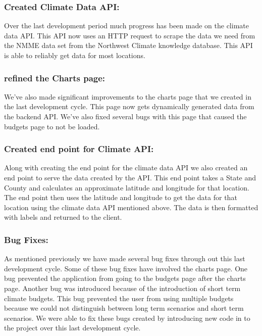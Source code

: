 \documentclass[onecolumn, draftclsnofoot,10pt, compsoc]{article}
\begin{document}
		\subsubsection{Created Climate Data API:}
		Over the last development period much progress has been made on the climate data API. This API now uses an HTTP request to scrape the data we need from the NMME data set from the Northwest Climate knowledge database. This API is able to reliably get data for most locations.\\
		
		\subsubsection{refined the Charts page:}
		We've also made significant improvements to the charts page that we created in the last development cycle. This page now gets dynamically generated data from the backend API. We've also fixed several bugs with this page that caused the budgets page to not be loaded.\\
		
		\subsubsection{Created end point for Climate API:}
		Along with creating the end point for the climate data API we also created an end point to serve the data created by the API. This end point takes a State and County and calculates an approximate latitude and longitude for that location. The end point then uses the latitude and longitude to get the data for that location using the climate data API mentioned above. The data is then formatted with labels and returned to the client.\\
		
		\subsubsection{Bug Fixes:}
		As mentioned previously we have made several bug fixes through out this last development cycle. Some of these bug fixes have involved the charts page. One bug prevented the application from going to the budgets page after the charts page. Another bug was introduced because of the introduction of short term climate budgets. This bug prevented the user from using multiple budgets because we could not distinguish between long term scenarios and short term scenarios. We were able to fix these bugs created by introducing new code in to the project over this last development cycle.
		
\end{document}
